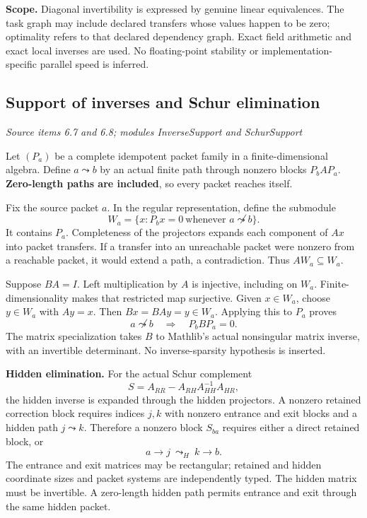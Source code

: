 \textbf{Scope.} Diagonal invertibility is expressed by genuine linear equivalences. The task graph may include declared transfers whose values happen to be zero; optimality refers to that declared dependency graph. Exact field arithmetic and exact local inverses are used. No floating-point stability or implementation-specific parallel speed is inferred.



\subsection{Support of inverses and Schur elimination}\label{supp5:subsection:003}\textit{Source items 6.7 and 6.8; modules InverseSupport and SchurSupport}\par
Let $(P_a)$ be a complete idempotent packet family in a finite-dimensional algebra. Define $a\leadsto b$ by an actual finite path through nonzero blocks $P_bAP_a$. \textbf{Zero-length paths are included}, so every packet reaches itself.

Fix the source packet $a$. In the regular representation, define the submodule
\[
W_a=\{x:P_bx=0\ \text{whenever }a\not\leadsto b\}.
\]
It contains $P_a$. Completeness of the projectors expands each component of $Ax$ into packet transfers. If a transfer into an unreachable packet were nonzero from a reachable packet, it would extend a path, a contradiction. Thus $AW_a\subseteq W_a$.

Suppose $BA=I$. Left multiplication by $A$ is injective, including on $W_a$. Finite-dimensionality makes that restricted map surjective. Given $x\in W_a$, choose $y\in W_a$ with $Ay=x$. Then $Bx=BAy=y\in W_a$. Applying this to $P_a$ proves
\[
\boxed{a\not\leadsto b\quad\Longrightarrow\quad P_bBP_a=0.}
\]
The matrix specialization takes $B$ to Mathlib's actual nonsingular matrix inverse, with an invertible determinant. No inverse-sparsity hypothesis is inserted.

\textbf{Hidden elimination.} For the actual Schur complement
\[
S=A_{RR}-A_{RH}A_{HH}^{-1}A_{HR},
\]
the hidden inverse is expanded through the hidden projectors. A nonzero retained correction block requires indices $j,k$ with nonzero entrance and exit blocks and a hidden path $j\leadsto k$. Therefore a nonzero block $S_{ba}$ requires either a direct retained block, or
\[
a\longrightarrow j\ \leadsto_{H}\ k\longrightarrow b.
\]
The entrance and exit matrices may be rectangular; retained and hidden coordinate sizes and packet systems are independently typed. The hidden matrix must be invertible. A zero-length hidden path permits entrance and exit through the same hidden packet.


